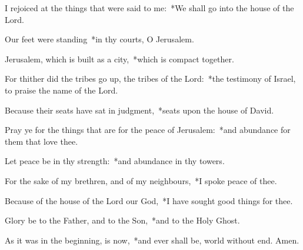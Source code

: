 \begin{enpars}
\item I rejoiced at the things that were said to me:~*We shall go into the house of the Lord.
\item Our feet were standing~*in thy courts, O Jerusalem.
\item Jerusalem, which is built as a city,~*which is compact together.
\item For thither did the tribes go up, the tribes of the Lord:~*the testimony of Israel, to praise the name of the Lord.
\item Because their seats have sat in judgment,~*seats upon the house of David.
\item Pray ye for the things that are for the peace of Jerusalem:~*and abundance for them that love thee.
\item Let peace be in thy strength:~*and abundance in thy towers.
\item For the sake of my brethren, and of my neighbours,~*I spoke peace of thee.
\item Because of the house of the Lord our God,~*I have sought good things for thee.
\item Glory be to the Father, and to the Son,~*and to the Holy Ghost. 
\item As it was in the beginning, is now,~*and ever shall be, world without end. Amen.
\end{enpars}